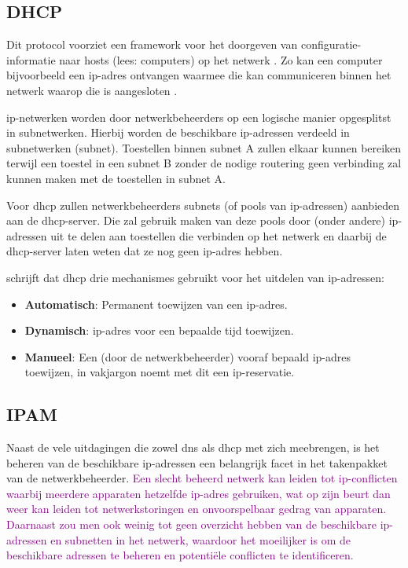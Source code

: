 {\subsection{DHCP}
Dit protocol voorziet een framework voor het doorgeven van configuratie-informatie naar hosts (lees: computers) op het netwerk . Zo kan een computer bijvoorbeeld een \acrshort{ip}-adres ontvangen waarmee die kan communiceren binnen het netwerk waarop die is aangesloten \autocite{Droms1997}.

\acrshort{ip}-netwerken worden door netwerkbeheerders op een logische manier opgesplitst in subnetwerken. Hierbij worden de beschikbare \acrshort{ip}-adressen verdeeld in subnetwerken (subnet). Toestellen binnen subnet A zullen elkaar kunnen bereiken terwijl een toestel in een subnet B zonder de nodige routering geen verbinding zal kunnen maken met de toestellen in subnet A.

Voor \acrshort{dhcp} zullen netwerkbeheerders subnets (of pools van \acrshort{ip}-adressen) aanbieden aan de \acrshort{dhcp}-server. Die zal gebruik maken van deze pools door (onder andere) \acrshort{ip}-adressen uit te delen aan toestellen die verbinden op het netwerk en daarbij de \acrshort{dhcp}-server laten weten dat ze nog geen \acrshort{ip}-adres hebben.

\textcite{Droms1997} schrijft dat \acrshort{dhcp} drie mechanismes gebruikt voor het uitdelen van \acrshort{ip}-adressen:
\begin{itemize}
    \item \textbf{Automatisch}: Permanent toewijzen van een \acrshort{ip}-adres.
    \item \textbf{Dynamisch}: \acrshort{ip}-adres voor een bepaalde tijd toewijzen.
    \item \textbf{Manueel}: Een (door de netwerkbeheerder) vooraf bepaald \acrshort{ip}-adres toewijzen, in vakjargon noemt met dit een \acrshort{ip}-reservatie.
\end{itemize}

\subsection{IPAM}
Naast de vele uitdagingen die zowel \acrshort{dns} als \acrshort{dhcp} met zich meebrengen, is het beheren van de beschikbare \acrshort{ip}-adressen een belangrijk facet in het takenpakket van de netwerkbeheerder. \textcolor{purple}{Een slecht beheerd netwerk kan leiden tot \acrshort{ip}-conflicten waarbij meerdere apparaten hetzelfde \acrshort{ip}-adres gebruiken, wat op zijn beurt dan weer kan leiden tot netwerkstoringen en onvoorspelbaar gedrag van apparaten. Daarnaast zou men ook weinig tot geen overzicht hebben van de beschikbare \acrshort{ip}-adressen en subnetten in het netwerk, waardoor het moeilijker is om de beschikbare adressen te beheren en potentiële conflicten te identificeren.}

}
